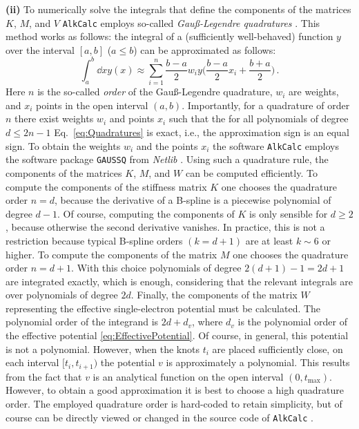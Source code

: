 \documentclass[fontsize=12pt,
               twoside=false,
               BCOR=0mm,
               DIV=14,
               overfullrule=false, %
               toc=bibliography,
               headinclude=true,
               footinclude=false]{scrartcl}
\numberwithin{equation}{section}
\newcommand{\alkcalc}{\texttt{AlkCalc} }
\begin{document}
    \bigskip

    \noindent \textbf{(ii)} To numerically solve the integrals that define the
    components of the matrices $K$, $M$, and $V$ \alkcalc employs so-called
    \emph{Gau\ss-Legendre quadratures} \cite{burden2011}. This method works as
    follows: the integral of a (sufficiently well-behaved) function $y$ over the
    interval $[a,b]$ ($a\leq{b}$) can be approximated as follows:
    \begin{equation}\label{eq:Quadratures}
        \int^b_a \dd{x} y(x)
        \approx
        \sum^n_{i=1}
        \frac{b-a}{2} w_i
        y\bigg(\frac{b-a}{2}x_i+\frac{b+a}{2}\bigg)
    \,.
    \end{equation}
    Here $n$ is the so-called \emph{order} of the Gau\ss-Legendre quadrature,
    $w_i$ are weights, and $x_i$ points in the open interval $(a,b)$.
    Importantly, for a quadrature of order $n$ there exist weights $w_i$ and
    points $x_i$ such that the for all polynomials of degree $d\leq2n-1$
    Eq.~\eqref{eq:Quadratures} is exact, i.e., the approximation sign is an
    equal sign. To obtain the weights $w_i$ and the points $x_i$ the software
    \alkcalc employs the software package \texttt{GAUSSQ} \cite{golub1969} from
    \emph{Netlib} \cite{dongarra1987}.  Using such a quadrature rule, the
    components of the matrices $K$, $M$, and $W$ can be computed efficiently. To
    compute the components of the stiffness matrix $K$ one chooses the
    quadrature order $n=d$, because the derivative of a B-spline is a piecewise
    polynomial of degree $d-1$. Of course, computing the components of $K$ is
    only sensible for $d\geq2$, because otherwise the second derivative
    vanishes. In practice, this is not a restriction because typical B-spline
    orders $(k=d+1)$ are at least $k{\sim}6$ or higher. To compute the
    components of the matrix $M$ one chooses the quadrature order $n=d+1$. With
    this choice polynomials of degree $2(d+1)-1=2d+1$ are integrated exactly,
    which is enough, considering that the relevant integrals are over
    polynomials of degree $2d$. Finally, the components of the matrix $W$
    representing the effective single-electron potential must be calculated.
    The polynomial order of the integrand is $2d+d_v$, where $d_v$ is the
    polynomial order of the effective potential \eqref{eq:EffectivePotential}.
    Of course, in general, this potential is not a polynomial. However, when the
    knots $t_i$ are placed sufficiently close, on each interval $[t_i,t_{i+1})$
    the potential $v$ is approximately a polynomial. This results from the fact
    that $v$ is an analytical function on the open interval
    $(0,t_\mathrm{max})$. However, to obtain a good approximation it is best to
    choose a high quadrature order. The employed quadrature order is hard-coded
    to retain simplicity, but of course can be directly viewed or changed in the
    source code of \alkcalc.
\end{document}

